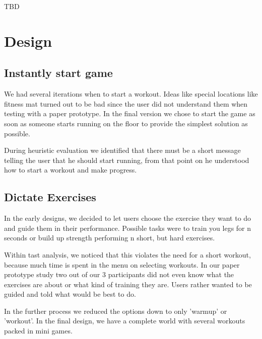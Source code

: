 \documentclass[twocolumn,showpacs,%
  nofootinbib,aps,superscriptaddress,%
  eqsecnum,prd,notitlepage,showkeys,10pt]{revtex4-1}
\begin{document}
TBD


\section{Design}

\subsection{Instantly start game}

We had several iterations when to start a workout. Ideas like special locations like fitness mat turned out to be bad since the user did not understand them  when testing with a paper prototype. In the final version we chose to start the game as soon as someone starts running on the floor to provide the simplest   solution as possible.

During heuristic evaluation we identified that there must be a short message telling the user that he should start running, from that point on he understood  how to start a workout and make progress.

\subsection{Dictate Exercises}

In the early designs, we decided to let users choose the exercise they want to do and guide them in their performance. Possible tasks were to train you legs  for n seconds or build up strength performing n short, but hard exercises.

Within tast analysis, we noticed that this violates the need for a short workout, because much time is spent in the menu on selecting workouts. In our paper  prototype study two out of our 3 participants did not even know what the exercises are about or what kind of training they are. Users rather wanted to be     guided and told what would be best to do.

In the further process we reduced the options down to only 'warmup' or 'workout'. In the final design, we have a complete world with several workouts packed  in mini games.
\end{document}
